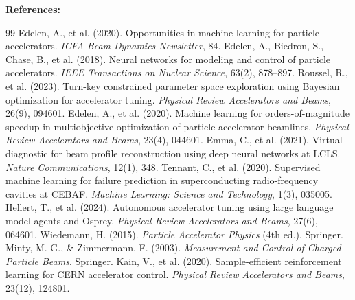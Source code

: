 \documentclass[11pt,a4paper]{article}
\begin{document}
\vspace{1.5em}
\noindent\textbf{References:}
\begin{small}
\begin{thebibliography}{99}
     Edelen, A., et al. (2020). Opportunities in machine learning for particle accelerators. \textit{ICFA Beam Dynamics Newsletter}, 84.
     Edelen, A., Biedron, S., Chase, B., et al. (2018). Neural networks for modeling and control of particle accelerators. \textit{IEEE Transactions on Nuclear Science}, 63(2), 878--897.
     Roussel, R., et al. (2023). Turn-key constrained parameter space exploration using Bayesian optimization for accelerator tuning. \textit{Physical Review Accelerators and Beams}, 26(9), 094601.
     Edelen, A., et al. (2020). Machine learning for orders-of-magnitude speedup in multiobjective optimization of particle accelerator beamlines. \textit{Physical Review Accelerators and Beams}, 23(4), 044601.
     Emma, C., et al. (2021). Virtual diagnostic for beam profile reconstruction using deep neural networks at LCLS. \textit{Nature Communications}, 12(1), 348.
     Tennant, C., et al. (2020). Supervised machine learning for failure prediction in superconducting radio-frequency cavities at CEBAF. \textit{Machine Learning: Science and Technology}, 1(3), 035005.
     Hellert, T., et al. (2024). Autonomous accelerator tuning using large language model agents and Osprey. \textit{Physical Review Accelerators and Beams}, 27(6), 064601.
     Wiedemann, H. (2015). \textit{Particle Accelerator Physics} (4th ed.). Springer.
     Minty, M. G., \& Zimmermann, F. (2003). \textit{Measurement and Control of Charged Particle Beams}. Springer.
     Kain, V., et al. (2020). Sample-efficient reinforcement learning for CERN accelerator control. \textit{Physical Review Accelerators and Beams}, 23(12), 124801.
\end{thebibliography}
\end{small}
\end{document}
